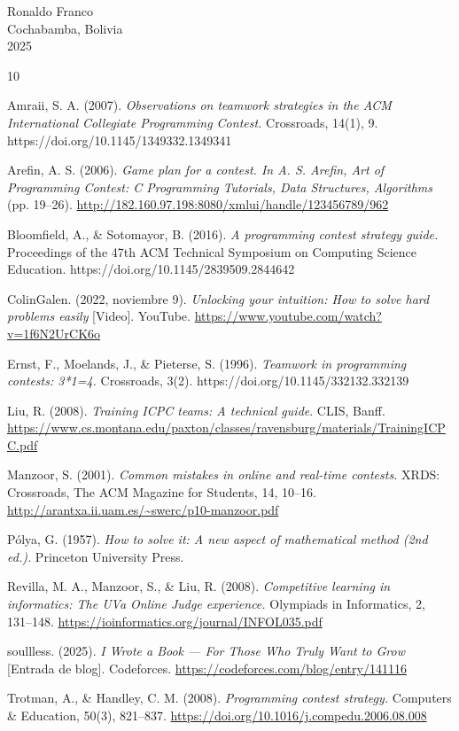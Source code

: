 \begin{flushright}
Ronaldo Franco\\
Cochabamba, Bolivia\\
2025
\end{flushright}
\clearpage
\begin{thebibliography}{10}

Amraii, S. A. (2007). \textit{Observations on teamwork strategies in the ACM International Collegiate Programming Contest.} Crossroads, 14(1), 9. https://doi.org/10.1145/1349332.1349341

Arefin, A. S. (2006). \textit{Game plan for a contest. In A. S. Arefin, Art of Programming Contest: C Programming Tutorials, Data Structures, Algorithms} (pp. 19--26). \url{http://182.160.97.198:8080/xmlui/handle/123456789/962}

Bloomfield, A., \& Sotomayor, B. (2016). \textit{A programming contest strategy guide.} Proceedings of the 47th ACM Technical Symposium on Computing Science Education. https://doi.org/10.1145/2839509.2844642

ColinGalen. (2022, noviembre 9). \textit{Unlocking your intuition: How to solve hard problems easily} [Video]. YouTube. \url{https://www.youtube.com/watch?v=1f6N2UrCK6o}

Ernst, F., Moelands, J., \& Pieterse, S. (1996). \textit{Teamwork in programming contests: 3*1=4.} Crossroads, 3(2). https://doi.org/10.1145/332132.332139

Liu, R. (2008). \textit{Training ICPC teams: A technical guide}. CLIS, Banff. \url{https://www.cs.montana.edu/paxton/classes/ravensburg/materials/TrainingICPC.pdf}

Manzoor, S. (2001). \textit{Common mistakes in online and real-time contests.} XRDS: Crossroads, The ACM Magazine for Students, 14, 10--16. \url{http://arantxa.ii.uam.es/~swerc/p10-manzoor.pdf}

Pólya, G. (1957). \textit{How to solve it: A new aspect of mathematical method (2nd ed.).} Princeton University Press.

Revilla, M. A., Manzoor, S., \& Liu, R. (2008). \textit{Competitive learning in informatics: The UVa Online Judge experience.} Olympiads in Informatics, 2, 131--148. \url{https://ioinformatics.org/journal/INFOL035.pdf}

soullless. (2025). \textit{I Wrote a Book — For Those Who Truly Want to Grow} [Entrada de blog]. Codeforces. \url{https://codeforces.com/blog/entry/141116}

Trotman, A., \& Handley, C. M. (2008). \textit{Programming contest strategy.} Computers \& Education, 50(3), 821--837. \url{https://doi.org/10.1016/j.compedu.2006.08.008}

\end{thebibliography}
